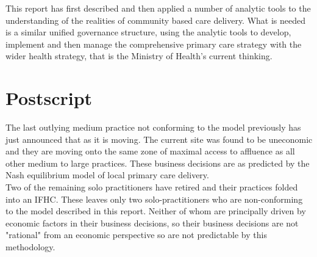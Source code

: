 \documentclass[11pt,a4paper]{article}
\begin{document}
This report has first described and then applied a number of analytic tools to the understanding of the realities of community based care delivery. What is needed is a similar unified governance structure, using the analytic tools to develop, implement and then manage the  comprehensive primary care strategy with the wider health strategy, that is the Ministry of Health's current thinking.\\

\section{Postscript}
The last outlying medium practice not conforming to the model previously has just announced that as it is moving. The current site was found to be uneconomic and they are moving onto the same zone of maximal access to affluence as all other medium to large practices. These business decisions are as predicted by the Nash equilibrium model of local primary care delivery. \\

Two of the remaining solo practitioners have retired and their practices folded into an IFHC. These leaves only two solo-practitioners who are non-conforming to the model described in this report. Neither of whom are principally driven by economic factors in their business decisions, so their business decisions are not "rational" from an economic perspective so are not predictable by this methodology.\\ 

\pagebreak


\end{document}
